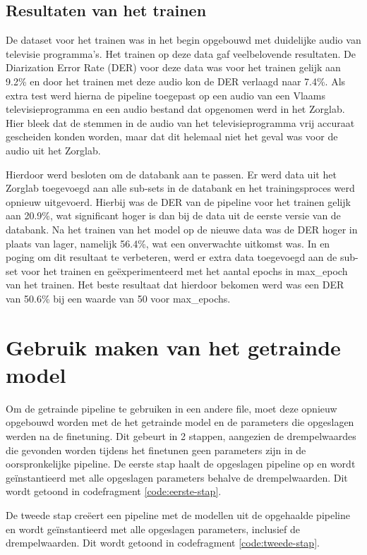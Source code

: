 \subsection{Resultaten van het trainen}
\label{subsec:train-res}

De dataset voor het trainen was in het begin opgebouwd met duidelijke audio van televisie programma's. Het trainen op deze data gaf veelbelovende resultaten. De Diarization Error Rate (DER) voor deze data was voor het trainen gelijk aan 9.2\% en door het trainen met deze audio kon de DER verlaagd naar 7.4\%. Als extra test werd hierna de pipeline toegepast op een audio van een Vlaams televisieprogramma en een audio bestand dat opgenomen werd in het Zorglab. Hier bleek dat de stemmen in de audio van het televisieprogramma vrij accuraat gescheiden konden worden, maar dat dit helemaal niet het geval was voor de audio uit het Zorglab.

Hierdoor werd besloten om de databank aan te passen. Er werd data uit het Zorglab toegevoegd aan alle sub-sets in de databank en het trainingsproces werd opnieuw uitgevoerd. Hierbij was de DER van de pipeline voor het trainen gelijk aan 20.9\%, wat significant hoger is dan bij de data uit de eerste versie van de databank. Na het trainen van het model op de nieuwe data was de DER hoger in plaats van lager, namelijk 56.4\%, wat een onverwachte uitkomst was. In en poging om dit resultaat te verbeteren, werd er extra data toegevoegd aan de sub-set voor het trainen en geëxperimenteerd met het aantal epochs in max\_epoch van het trainen. Het beste resultaat dat hierdoor bekomen werd was een DER van 50.6\% bij een waarde van 50 voor max\_epochs.

\section{Gebruik maken van het getrainde model}
\label{sec:gebruik}
Om de getrainde pipeline te gebruiken in een andere file, moet deze opnieuw opgebouwd worden met de het getrainde model en de parameters die opgeslagen werden na de finetuning. Dit gebeurt in 2 stappen, aangezien de drempelwaardes die gevonden worden tijdens het finetunen geen parameters zijn in de oorspronkelijke pipeline. De eerste stap haalt de opgeslagen pipeline op en wordt geïnstantieerd met alle opgeslagen parameters behalve de drempelwaarden. Dit wordt getoond in codefragment \ref{code:eerste-stap}.

De tweede stap creëert een pipeline met de modellen uit de opgehaalde pipeline en wordt geïnstantieerd met alle opgeslagen parameters, inclusief de drempelwaarden. Dit wordt getoond in codefragment \ref{code:tweede-stap}.

